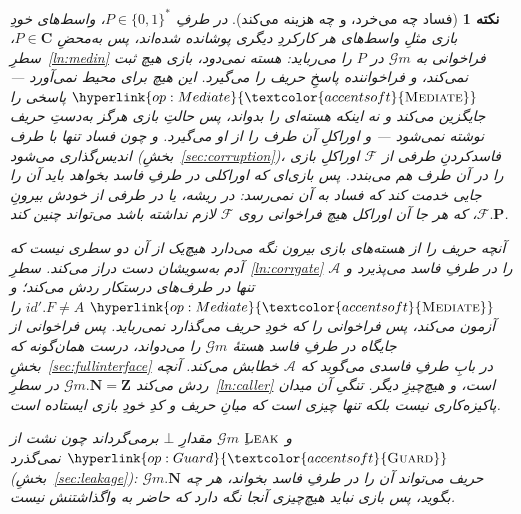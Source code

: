 \documentclass[10pt,oneside,openany]{book}
\newcommand{\Ps}{\mathbf{P}}
\newcommand{\admits}{\mathbf{N}}
\newcommand{\Zpid}{\mathbf{Z}}
\newcommand{\Cs}{\mathbf{C}}
\newcommand{\F}{\mathcal{F}}
\newcommand{\Adv}{\mathcal{A}}
\newcommand{\op}[1]{\textnormal{\textsc{#1}}}
\newcommand{\opl}[1]{\hyperlink{op:#1}{\textcolor{accentsoft}{\op{#1}}}}
\newcommand{\id}{id}
\newcommand{\Gm}{\mathcal{G}m}
\newcommand{\none}{\bot}
\newcommand{\bits}{\{0,1\}^*}
\theoremstyle{accentdef}
\newtheorem{remark}[definition]{نکته}
\theoremstyle{accentplain}
\begin{document}
\begin{remark}[فساد چه می‌خرد، و چه هزینه می‌کند]\label{rem:gmcorr}
در طرفِ $P \in \bits$، واسط‌های خودِ بازی مثلِ واسط‌های هر کارکردِ دیگری
پوشانده شده‌اند، پس به‌محضِ $P \in \Cs$، سطرِ~\ref{ln:medin} فراخوانی به
$\Gm$ در $P$ را می‌رباید: هسته نمی‌دود، بازی هیچ ثبت نمی‌کند، و
فراخواننده پاسخِ حریف را می‌گیرد. این هیچ برای محیط نمی‌آورد ---
$\opl{Mediate}$ پاسخی را جایگزین می‌کند و نه اینکه هسته‌ای را بدواند، پس
حالتِ بازی هرگز به‌دستِ حریف نوشته نمی‌شود --- و اوراکلِ آن طرف را از او
می‌گیرد. و چون فساد تنها با طرف اندیس‌گذاری می‌شود
(بخشِ~\ref{sec:corruption})، فاسدکردنِ طرفی از $\F$ اوراکلِ بازی را در آن
طرف هم می‌بندد. پس بازی‌ای که اوراکلی در طرفِ فاسد بخواهد باید آن را جایی
خدمت کند که فساد به آن نمی‌رسد: در ریشه، یا در طرفی از خودش بیرونِ
$\F.\Ps$، که هر جا آن اوراکل هیچ فراخوانی روی $\F$ لازم نداشته باشد
می‌تواند چنین کند.

آنچه حریف را از هسته‌های بازی بیرون نگه می‌دارد هیچ‌یک از آن دو سطری نیست
که آدم به‌سویشان دست دراز می‌کند. سطرِ~\ref{ln:corrgate} $\Adv$ را در طرفِ
فاسد \emph{می‌پذیرد} و تنها در طرف‌های درستکار ردش می‌کند؛ و
$\opl{Mediate}$ $\id'.F \neq A$ را آزمون می‌کند، پس فراخوانی را که خودِ
حریف می‌گذارد نمی‌رباید. پس فراخوانی از جایگاه در طرفِ فاسد هستهٔ $\Gm$ را
می‌دواند، درست همان‌گونه که بخشِ~\ref{sec:fullinterface} در بابِ طرفِ
فاسدی می‌گوید که $\Adv$ خطابش می‌کند. آنچه ردش می‌کند $\Gm.\admits =
\Zpid$ در سطرِ~\ref{ln:caller} است، و هیچ‌چیزِ دیگر. تنگیِ آن میدان
پاکیزه‌کاری نیست بلکه تنها چیزی است که میانِ حریف و کدِ خودِ بازی ایستاده
است.

و $\op{Leak}$ِ $\Gm$ مقدارِ $\none$ برمی‌گرداند چون نشت از $\opl{Guard}$
نمی‌گذرد (بخشِ~\ref{sec:leakage}): حریف می‌تواند آن را در طرفِ فاسد
بخواند، هر چه $\Gm.\admits$ بگوید، پس بازی نباید هیچ‌چیزی آنجا نگه دارد که
حاضر به واگذاشتنش نیست.
\end{remark}
\end{document}
